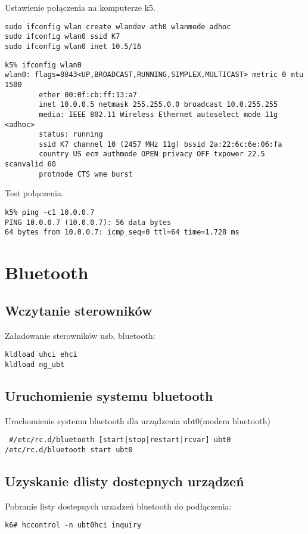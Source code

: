 \documentclass[a4paper,11pt,notitlepage]{article}
\begin{document}
Ustawienie połączenia na komputerze k5.
\begin{verbatim}
sudo ifconfig wlan create wlandev ath0 wlanmode adhoc
sudo ifconfig wlan0 ssid K7
sudo ifconfig wlan0 inet 10.5/16
\end{verbatim}

\begin{verbatim}
k5% ifconfig wlan0
wlan0: flags=8843<UP,BROADCAST,RUNNING,SIMPLEX,MULTICAST> metric 0 mtu 1500
        ether 00:0f:cb:ff:13:a7
        inet 10.0.0.5 netmask 255.255.0.0 broadcast 10.0.255.255
        media: IEEE 802.11 Wireless Ethernet autoselect mode 11g <adhoc>
        status: running
        ssid K7 channel 10 (2457 MHz 11g) bssid 2a:22:6c:6e:06:fa
        country US ecm authmode OPEN privacy OFF txpower 22.5 scanvalid 60
        protmode CTS wme burst
\end{verbatim}

Test połączenia.
\begin{verbatim}
k5% ping -c1 10.0.0.7
PING 10.0.0.7 (10.0.0.7): 56 data bytes
64 bytes from 10.0.0.7: icmp_seq=0 ttl=64 time=1.728 ms
\end{verbatim}

\section{Bluetooth}
\subsection{Wczytanie sterowników}
Załadowanie sterowników usb, bluetooth:
\begin{verbatim}
kldload uhci ehci
kldload ng_ubt
\end{verbatim}
\subsection{Uruchomienie systemu bluetooth}
Urochomienie systemu bluetooth dla urządzenia ubt0(modem bluetooth)
 \begin{verbatim}
 #/etc/rc.d/bluetooth [start|stop|restart|rcvar] ubt0
/etc/rc.d/bluetooth start ubt0
\end{verbatim}
\subsection{Uzyskanie dlisty dostepnych urządzeń}

Pobranie listy dostepnych urzadzeń bluetooth do podłączenia:

\begin{verbatim}
k6# hccontrol -n ubt0hci inquiry
\end{verbatim}
\end{document}
